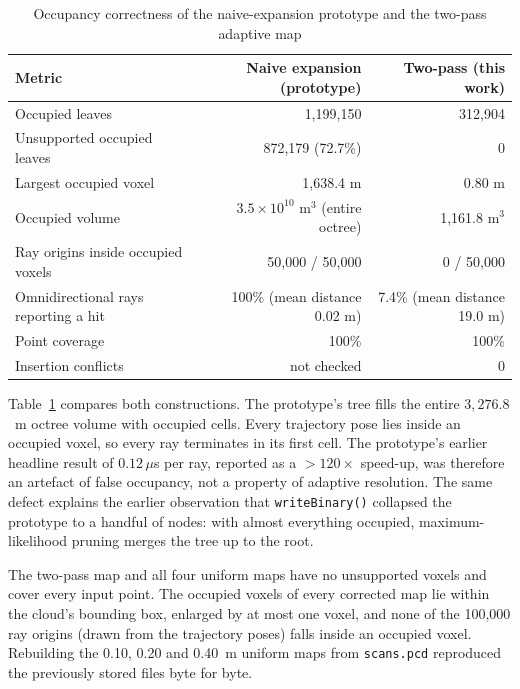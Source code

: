 \documentclass[11pt,a4paper]{report}
\begin{document}
\begin{table}[H]
    \centering
    \caption{Occupancy correctness of the naive-expansion prototype and the two-pass adaptive map}
    \label{tab:verification}
    \vspace{2mm}
    \small
    \setlength{\tabcolsep}{4pt}
    \begin{tabular}{lrr}
        \toprule
        \textbf{Metric} & \textbf{Naive expansion (prototype)} & \textbf{Two-pass (this work)} \\
        \midrule
        Occupied leaves & 1,199,150 & 312,904 \\
        Unsupported occupied leaves & 872,179 (72.7\%) & 0 \\
        Largest occupied voxel & 1,638.4 m & 0.80 m \\
        Occupied volume & $3.5 \times 10^{10}$ m$^3$ (entire octree) & 1,161.8 m$^3$ \\
        Ray origins inside occupied voxels & 50,000 / 50,000 & 0 / 50,000 \\
        Omnidirectional rays reporting a hit & 100\% (mean distance 0.02 m) & 7.4\% (mean distance 19.0 m) \\
        Point coverage & 100\% & 100\% \\
        Insertion conflicts & not checked & 0 \\
        \bottomrule
    \end{tabular}
\end{table}

Table~\ref{tab:verification} compares both constructions. The prototype's tree fills the entire $3{,}276.8$~m octree volume with occupied cells. Every trajectory pose lies inside an occupied voxel, so every ray terminates in its first cell. The prototype's earlier headline result of $0.12\,\mu$s per ray, reported as a $>120\times$ speed-up, was therefore an artefact of false occupancy, not a property of adaptive resolution. The same defect explains the earlier observation that \texttt{writeBinary()} collapsed the prototype to a handful of nodes: with almost everything occupied, maximum-likelihood pruning merges the tree up to the root.

The two-pass map and all four uniform maps have no unsupported voxels and cover every input point. The occupied voxels of every corrected map lie within the cloud's bounding box, enlarged by at most one voxel, and none of the 100,000 ray origins (drawn from the trajectory poses) falls inside an occupied voxel. Rebuilding the 0.10, 0.20 and 0.40~m uniform maps from \texttt{scans.pcd} reproduced the previously stored files byte for byte.
\end{document}

